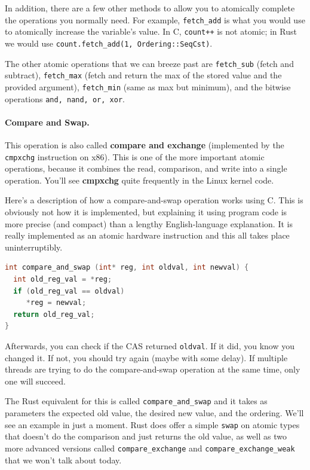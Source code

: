 \documentclass[a4paper]{report}
\begin{document}
In addition, there are a few other methods to allow you to atomically complete the operations you normally need. For example, \texttt{fetch\_add} is what you would use to atomically increase the variable's value. In C, \texttt{count++} is not atomic; in Rust we would use \texttt{count.fetch\_add(1, Ordering::SeqCst)}.

The other atomic operations that we can breeze past are \texttt{fetch\_sub} (fetch and subtract), \texttt{fetch\_max} (fetch and return the max of the stored value and the provided argument), \texttt{fetch\_min} (same as max but minimum), and the bitwise operations \texttt{and, nand, or, xor}.


\paragraph{Compare and Swap.} This operation is also called {\bf compare and exchange} (implemented by the {\tt cmpxchg} instruction on x86). This is one of the more important atomic operations, because it combines the read, comparison, and write into a single operation. You'll see {\bf cmpxchg} quite frequently in the Linux kernel code.

Here's a description of how a compare-and-swap operation works using C. This is obviously not how it is implemented, but explaining it using program code is more precise (and compact) than a lengthy English-language explanation. It is really implemented as an atomic hardware instruction and this all takes place uninterruptibly. 

  \begin{lstlisting}[language=C]
int compare_and_swap (int* reg, int oldval, int newval) {
  int old_reg_val = *reg;
  if (old_reg_val == oldval) 
     *reg = newval;
  return old_reg_val;
}
  \end{lstlisting}

Afterwards, you can check if the CAS returned {\tt oldval}. If it did, you know you changed it. If not, you should try again (maybe with some delay). If multiple threads are trying to do the compare-and-swap operation at the same time, only one will succeed. 

The Rust equivalent for this is called \texttt{compare\_and\_swap} and it takes as parameters the expected old value, the desired new value, and the ordering. We'll see an example in just a moment. Rust does offer a simple \texttt{swap} on atomic types that doesn't do the comparison and just returns the old value, as well as two more advanced versions called \texttt{compare\_exchange} and \texttt{compare\_exchange\_weak} that we won't talk about today.
\end{document}
